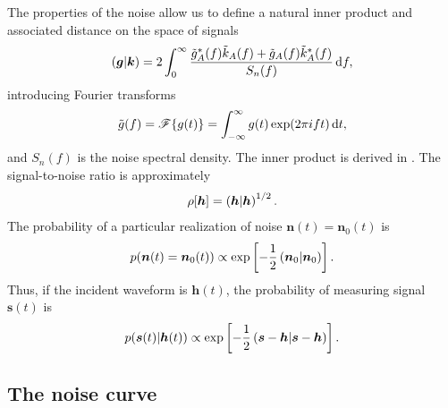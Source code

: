 The properties of the noise allow us to define a natural inner product and associated distance on the space of signals \citep{Cutler1994}
\begin{equation}
\left({\boldsymbol{g}}\middle|{\boldsymbol{k}}\right) = 2\int_{0}^{\infty}{\frac{\tilde{g}_A^\ast(f)\tilde{k}_A(f) + \tilde{g}_A(f)\tilde{k}_A^\ast(f)}{S_{n}(f)}}\,\mathrm{d}{f},
\label{eq:inner}
\end{equation}
introducing Fourier transforms
\begin{equation}
\tilde{g}(f) = \mathscr{F}\{g(t)\} = \int_{-\infty}^{\infty}{g(t)\exp(2\pi i ft)}\,\mathrm{d}{t},
\end{equation}
and $S_{n}(f)$ is the noise spectral density. The inner product is derived in . The signal-to-noise ratio is approximately
\begin{equation}
\rho[\boldsymbol{h}] = \left({\boldsymbol{h}}\middle|{\boldsymbol{h}}\right)^{1/2}.
\label{eq:SNR}
\end{equation}
The probability of a particular realization of noise $\boldsymbol{n}(t) = \boldsymbol{n}_0(t)$ is
\begin{equation}
p(\boldsymbol{n}(t) = \boldsymbol{n}_0(t)) \propto \exp\left[-\frac{1}{2}\left({\boldsymbol{n}_0}\middle|{\boldsymbol{n}_0}\right)\right].
\end{equation}
Thus, if the incident waveform is $\boldsymbol{h}(t)$, the probability of measuring signal $\boldsymbol{s}(t)$ is
\begin{equation}
p(\boldsymbol{s}(t)|\boldsymbol{h}(t)) \propto \exp\left[-\frac{1}{2}\left({\boldsymbol{s}-\boldsymbol{h}}\middle|{\boldsymbol{s}-\boldsymbol{h}}\right)\right].
\label{eq:sig_prob}
\end{equation}

\subsection{The noise curve}\label{sec:Noise}


